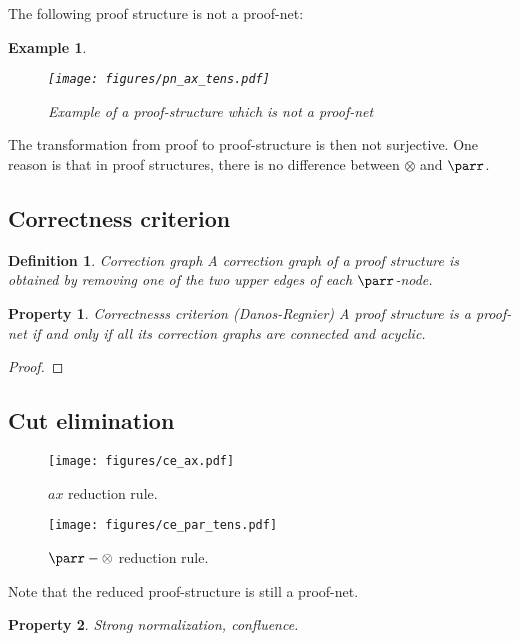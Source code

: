 \documentclass[a4paper,10pt]{article}
\newtheorem{definition}{Definition}
\newtheorem{prop}{Property}
\newtheorem{ex}{Example}
\begin{document}
The following proof structure is not a proof-net:
\begin{ex}
	\begin{figure}[h]
	\begin{center}
		\texttt{[image: figures/pn\_ax\_tens.pdf]}
		\caption{Example of a proof-structure which is not a proof-net}
	\end{center}
	\end{figure}	
\end{ex}

The transformation from proof to proof-structure is then not surjective. One reason is that in proof structures, there is no difference between $\otimes$ and $\parr$.

\subsection{Correctness criterion}

\begin{definition}{Correction graph}
	A correction graph of a proof structure is obtained by removing one of the two upper edges of each $\parr$-node.
\end{definition}

\begin{prop}{Correctnesss criterion (Danos-Regnier)}
	A proof structure is a proof-net if and only if all its correction graphs are connected and acyclic.
\end{prop}
\begin{proof}
\end{proof}

\subsection{Cut elimination}
	\begin{figure}[h]
	\begin{center}
		\texttt{[image: figures/ce\_ax.pdf]}
		\caption{$ax$ reduction rule.}
		\texttt{[image: figures/ce\_par\_tens.pdf]}
		\caption{$\parr - \otimes$ reduction rule.}
		
	\end{center}
	\end{figure}	
	
	Note that the reduced proof-structure is still a proof-net.
	
	\begin{prop}
	Strong normalization, confluence.
	\end{prop}	
	
\end{document}
